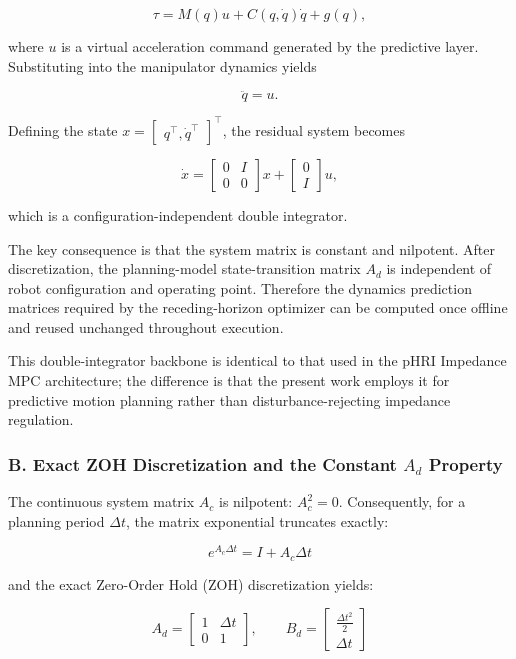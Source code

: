 \[ \tau = M(q)u + C(q,\dot q)\dot q + g(q), \]

where \(u\) is a virtual acceleration command generated by the
predictive layer. Substituting into the manipulator dynamics yields

\[ \ddot q = u. \]

Defining the state
\(x = \begin{bmatrix} q ^\top, \dot q ^\top \end{bmatrix} ^\top\), the
residual system becomes

\[\dot x = \begin{bmatrix} 0&I\\ 0&0 \end{bmatrix}x +
\begin{bmatrix} 0\\ I \end{bmatrix}u, \]

which is a configuration-independent double integrator.

The key consequence is that the system matrix is constant and nilpotent.
After discretization, the planning-model state-transition matrix \(A_d\)
is independent of robot configuration and operating point. Therefore the
dynamics prediction matrices required by the receding-horizon optimizer
can be computed once offline and reused unchanged throughout execution.

This double-integrator backbone is identical to that used in the pHRI
Impedance MPC architecture; the difference is that the present work
employs it for predictive motion planning rather than
disturbance-rejecting impedance regulation.

\subsubsection{\texorpdfstring{B. Exact ZOH Discretization and the
Constant \(A_d\)
Property}{B. Exact ZOH Discretization and the Constant A\_d Property}}\label{b.-exact-zoh-discretization-and-the-constant-a_d-property}

The continuous system matrix \(A_c\) is nilpotent: \(A_c^2 = 0\).
Consequently, for a planning period \(\Delta t\), the matrix exponential
truncates exactly:

\[e^{A_c \Delta t} = I + A_c \Delta t\]

and the exact Zero-Order Hold (ZOH) discretization yields:

\[A_d = \begin{bmatrix} 1 & \Delta t \\ 0 & 1 \end{bmatrix}, \qquad B_d = \begin{bmatrix} \frac{\Delta t^2}{2} \\ \Delta t \end{bmatrix}\]

